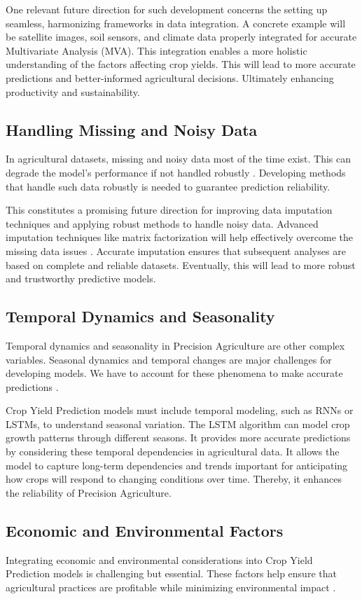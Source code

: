 \documentclass[conference]{IEEEtran}
\begin{document}
One relevant future direction for such development concerns the setting up seamless, harmonizing frameworks in data integration. A concrete example will be satellite images, soil sensors, and climate data properly integrated for accurate Multivariate Analysis (MVA). This integration enables a more holistic understanding of the factors affecting crop yields. This will lead to more accurate predictions and better-informed agricultural decisions. Ultimately enhancing productivity and sustainability.

\subsection{Handling Missing and Noisy Data}\label{AA}
In agricultural datasets, missing and noisy data most of the time exist. This can degrade the model's performance if not handled robustly \cite{b89}. Developing methods that handle such data robustly is needed to guarantee prediction reliability. 

This constitutes a promising future direction for improving data imputation techniques and applying robust methods to handle noisy data. Advanced imputation techniques like matrix factorization will help effectively overcome the missing data issues \cite{b90}. Accurate imputation ensures that subsequent analyses are based on complete and reliable datasets. Eventually, this will lead to more robust and trustworthy predictive models. 

\subsection{Temporal Dynamics and Seasonality}\label{AA}
Temporal dynamics and seasonality in Precision Agriculture are other complex variables. Seasonal dynamics and temporal changes are major challenges for developing models. We have to account for these phenomena to make accurate predictions \cite{b91}. 

Crop Yield Prediction models must include temporal modeling, such as RNNs or LSTMs, to understand seasonal variation. The LSTM algorithm can model crop growth patterns through different seasons. It provides more accurate predictions by considering these temporal dependencies in agricultural data. It allows the model to capture long-term dependencies and trends important for anticipating how crops will respond to changing conditions over time. Thereby, it enhances the reliability of Precision Agriculture.

\subsection{Economic and Environmental Factors}\label{AA}
Integrating economic and environmental considerations into Crop Yield Prediction models is challenging but essential. These factors help ensure that agricultural practices are profitable while minimizing environmental impact \cite{b92}.
\end{document}
